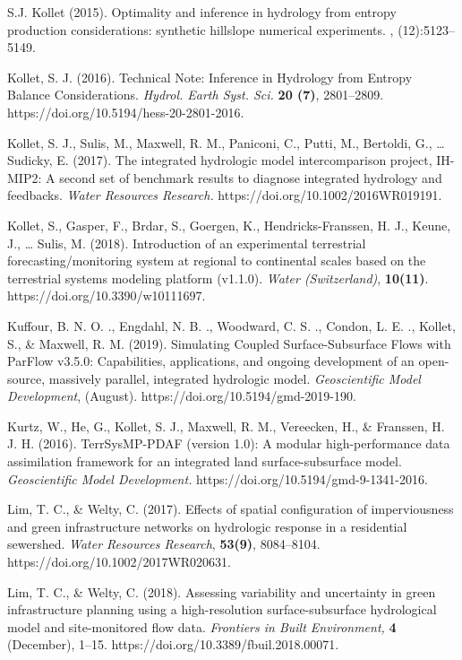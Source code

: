 \begin{thebibliography}{999}
	S.J. Kollet (2015).
\newblock Optimality and inference in hydrology from entropy production
  considerations: synthetic hillslope numerical experiments.
, (12):5123--5149.

Kollet, S. J. (2016). Technical Note: Inference in Hydrology from Entropy Balance Considerations. {\em Hydrol. Earth Syst. Sci.} {\bf 20 (7)}, 2801–2809. https://doi.org/10.5194/hess-20-2801-2016.


Kollet, S. J., Sulis, M., Maxwell, R. M., Paniconi, C., Putti, M., Bertoldi, G., … Sudicky, E. (2017). The integrated hydrologic model intercomparison project, IH-MIP2: A second set of benchmark results to diagnose integrated hydrology and feedbacks. {\em Water Resources Research.} https://doi.org/10.1002/2016WR019191.


Kollet, S., Gasper, F., Brdar, S., Goergen, K., Hendricks-Franssen, H. J., Keune, J., … Sulis, M. (2018). Introduction of an experimental terrestrial forecasting/monitoring system at regional to continental scales based on the terrestrial systems modeling platform (v1.1.0). {\em Water (Switzerland)}, {\bf 10(11)}. https://doi.org/10.3390/w10111697.


Kuffour, B. N. O. ., Engdahl, N. B. ., Woodward, C. S. ., Condon, L. E. ., Kollet, S., \& Maxwell, R. M. (2019). Simulating Coupled Surface-Subsurface Flows with ParFlow v3.5.0: Capabilities, applications, and ongoing development of an open-source, massively parallel, integrated hydrologic model. {\em Geoscientific Model Development}, (August). https://doi.org/10.5194/gmd-2019-190.


Kurtz, W., He, G., Kollet, S. J., Maxwell, R. M., Vereecken, H., \& Franssen, H. J. H. (2016). TerrSysMP-PDAF (version 1.0): A modular high-performance data assimilation framework for an integrated land surface-subsurface model. {\em Geoscientific Model Development.} https://doi.org/10.5194/gmd-9-1341-2016.


Lim, T. C., \& Welty, C. (2017). Effects of spatial configuration of imperviousness and green infrastructure networks on hydrologic response in a residential sewershed. {\em Water Resources Research}, {\bf 53(9)}, 8084–8104. https://doi.org/10.1002/2017WR020631.


Lim, T. C., \& Welty, C. (2018). Assessing variability and uncertainty in green infrastructure planning using a high-resolution surface-subsurface hydrological model and site-monitored flow data. {\em Frontiers in Built Environment,} {\bf 4} (December), 1–15. https://doi.org/10.3389/fbuil.2018.00071.



\end{thebibliography}
